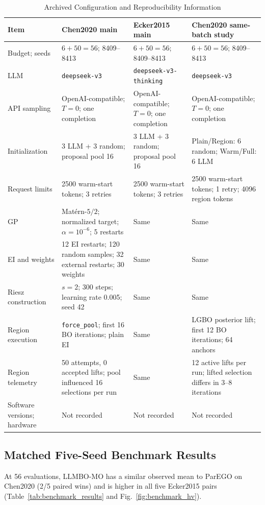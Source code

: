 \begin{table}[!t]
\caption{Archived Configuration and Reproducibility Information}
\label{tab:reproducibility}
\centering
\scriptsize
\setlength{\tabcolsep}{3.5pt}
\begin{tabular}{@{}p{}p{}
p{}p{}@{}}
\toprule
Item & Chen2020 main & Ecker2015 main & Chen2020 same-batch study \\
\midrule
Budget; seeds
& $6+50=56$; 8409--8413
& $6+50=56$; 8409--8413
& $6+50=56$; 8409--8413 \\
LLM
& \texttt{deepseek-v3}
& \texttt{deepseek-v3-thinking}
& \texttt{deepseek-v3} \\
API sampling
& OpenAI-compatible; $T=0$; one completion
& OpenAI-compatible; $T=0$; one completion
& OpenAI-compatible; $T=0$; one completion \\
Initialization
& 3 LLM + 3 random; proposal pool 16
& 3 LLM + 3 random; proposal pool 16
& Plain/Region: 6 random; Warm/Full: 6 LLM \\
Request limits
& 2500 warm-start tokens; 3 retries
& 2500 warm-start tokens; 3 retries
& 2500 warm-start tokens; 1 retry; 4096 region tokens \\
GP
& Mat\'ern-$5/2$; normalized target; $\alpha=10^{-6}$; 5 restarts
& Same
& Same \\
EI and weights
& 12 EI restarts; 120 random samples; 32 external restarts; 30 weights
& Same
& Same \\
Riesz construction
& $s=2$; 300 steps; learning rate 0.005; seed 42
& Same
& Same \\
Region execution
& \texttt{force\_pool}; first 16 BO iterations; plain EI
& Same
& LGBO posterior lift; first 12 BO iterations; 64 anchors \\
Region telemetry
& 50 attempts, 0 accepted lifts; pool influenced 16 selections per run
& Same
& 12 active lifts per run; lifted selection differs in 3--8 iterations \\
Software versions; hardware
& Not recorded & Not recorded & Not recorded \\
\bottomrule
\end{tabular}
\end{table}

\subsection{Matched Five-Seed Benchmark Results}

At 56 evaluations, LLMBO-MO has a similar observed mean to ParEGO on Chen2020
(2/5 paired wins) and is higher in all five Ecker2015 pairs
(Table~\ref{tab:benchmark_results} and Fig.~\ref{fig:benchmark_hv}).

